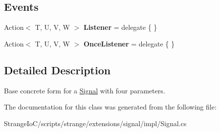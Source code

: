 \subsection*{Events}
\begin{DoxyCompactItemize}
\item 
\hypertarget{classstrange_1_1extensions_1_1signal_1_1impl_1_1_signal_3_01_t_00_01_u_00_01_v_00_01_w_01_4_ac72dbb74abcb8029fa9e4e683d23df37}{Action$<$ T, U, V, W $>$ {\bfseries Listener} = delegate \{ \}}\label{classstrange_1_1extensions_1_1signal_1_1impl_1_1_signal_3_01_t_00_01_u_00_01_v_00_01_w_01_4_ac72dbb74abcb8029fa9e4e683d23df37}

\item 
\hypertarget{classstrange_1_1extensions_1_1signal_1_1impl_1_1_signal_3_01_t_00_01_u_00_01_v_00_01_w_01_4_a50dda141e6f8dd2e0cb99b20649e27bd}{Action$<$ T, U, V, W $>$ {\bfseries Once\-Listener} = delegate \{ \}}\label{classstrange_1_1extensions_1_1signal_1_1impl_1_1_signal_3_01_t_00_01_u_00_01_v_00_01_w_01_4_a50dda141e6f8dd2e0cb99b20649e27bd}

\end{DoxyCompactItemize}


\subsection{Detailed Description}
Base concrete form for a \hyperlink{classstrange_1_1extensions_1_1signal_1_1impl_1_1_signal}{Signal} with four parameters. 

The documentation for this class was generated from the following file\-:\begin{DoxyCompactItemize}
\item 
Strange\-Io\-C/scripts/strange/extensions/signal/impl/Signal.\-cs\end{DoxyCompactItemize}
